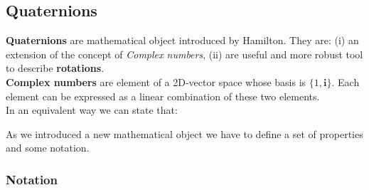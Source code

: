 \subsection{Quaternions}
\textbf{Quaternions} are mathematical object introduced by Hamilton. They are: (i) an extension of the concept of \textit{Complex numbers}, (ii) are useful and more robust tool to describe \textbf{rotations}. \\
\textbf{Complex numbers} are element of a 2D-vector space whose basis is $\{1,\mathbf{i}\}$. Each element can be expressed as a linear combination of these two elements.\\
In an equivalent way we can state that:\\

\hspace*{-5mm}
%

\noindent
As we introduced a new mathematical object we have to define a set of properties and some notation.

{\color{red} \subsubsection*{Notation}}

